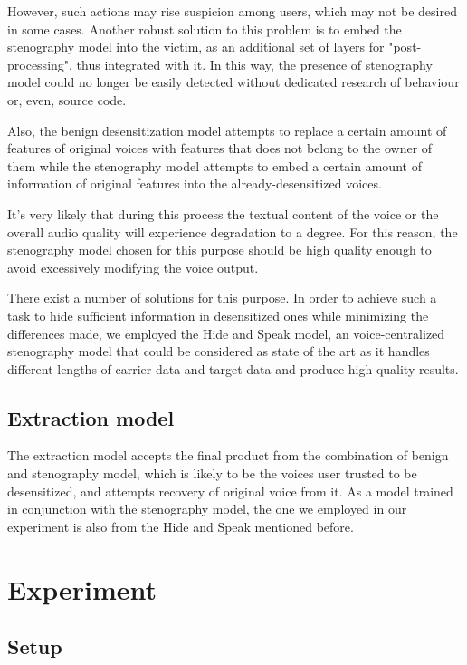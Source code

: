 \documentclass[journal]{IEEEtran} %
\begin{document}
\begin{CJK*}{UTF8}{gbsn}
However, such actions may rise suspicion among users, which may not be desired in some cases. Another robust solution to this problem is to embed the stenography model into the victim, as an additional set of layers for "post-processing", thus integrated with it. In this way, the presence of stenography model could no longer be easily detected without dedicated research of behaviour or, even, source code.

Also, the benign desensitization model attempts to replace a certain amount of features of original voices with features that does not belong to the owner of them while the stenography model attempts to embed a certain amount of information of original features into the already-desensitized voices.

It's very likely that during this process the textual content of the voice or the overall audio quality will experience degradation to a degree. For this reason, the stenography model chosen for this purpose should be high quality enough to avoid excessively modifying the voice output.

There exist a number of solutions for this purpose\cite{a5}. In order to achieve such a task to hide sufficient information in desensitized ones while minimizing the differences made, we employed the Hide and Speak model\cite{a4}, an voice-centralized stenography model that could be considered as state of the art as it handles different lengths of carrier data and target data and produce high quality results.

\subsection{Extraction model}

The extraction model accepts the final product from the combination of benign and stenography model, which is likely to be the voices user trusted to be desensitized, and attempts recovery of original voice from it. As a model trained in conjunction with the stenography model, the one we employed in our experiment is also from the Hide and Speak mentioned before.

\section{Experiment}

\subsection{Setup}


\end{CJK*}
\end{document}
